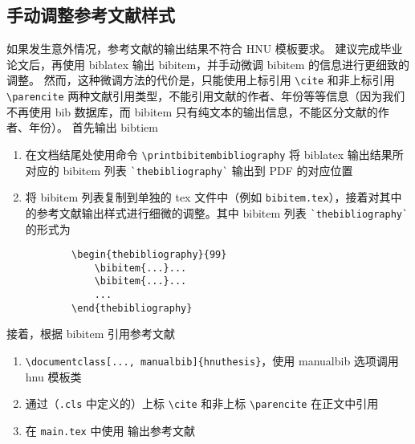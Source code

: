 \subsection{手动调整参考文献样式}\label{subsec.bibitem}
如果发生意外情况，参考文献的输出结果不符合 HNU 模板要求。
建议完成毕业论文后，再使用 biblatex 输出 bibitem，并手动微调 bibitem 的信息进行更细致的调整。
然而，这种微调方法的代价是，只能使用上标引用 \verb|\cite| 和非上标引用 \verb|\parencite| 两种文献引用类型，不能引用文献的作者、年份等等信息（因为我们不再使用 bib 数据库，而 bibitem 只有纯文本的输出信息，不能区分文献的作者、年份）。
首先输出 bibtiem
\begin{enumerate}
    \item 在文档结尾处使用命令 \verb|\printbibitembibliography| 将 biblatex 输出结果所对应的 bibitem 列表 \verb|`thebibliography`| 输出到 PDF 的对应位置
    \item 将 bibitem 列表复制到单独的 tex 文件中（例如 \verb|bibitem.tex|），接着对其中的参考文献输出样式进行细微的调整。其中 bibitem 列表 \verb|`thebibliography`| 的形式为
    \begin{verbatim}
        \begin{thebibliography}{99}
            \bibitem{...}...
            \bibitem{...}...
            ... 
        \end{thebibliography}
    \end{verbatim}
\end{enumerate}
接着，根据 bibitem 引用参考文献
\begin{enumerate}
    \item \verb|\documentclass[..., manualbib]{hnuthesis}|，使用 manualbib 选项调用 hnu 模板类
    \item 通过（\verb|.cls| 中定义的）上标 \verb|\cite| 和非上标 \verb|\parencite| 在正文中引用
    \item 在 \verb|main.tex| 中使用 \verb|| 输出参考文献
\end{enumerate}
